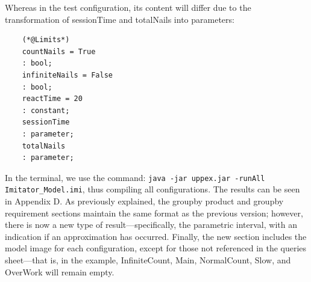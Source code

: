 Whereas in the test configuration, its content will differ due to the transformation of sessionTime and totalNails into parameters:

\begin{verbatim}
    (*@Limits*)
    countNails = True
    : bool;
    infiniteNails = False
    : bool;
    reactTime = 20
    : constant;
    sessionTime
    : parameter;
    totalNails
    : parameter;
\end{verbatim}


In the terminal, we use the command: \texttt{java -jar uppex.jar -runAll Imitator\_Model.imi}, thus compiling all configurations. The results can be seen in Appendix D. As previously explained, the groupby product and groupby requirement sections maintain the same format as the previous version; however, there is now a new type of result—specifically, the parametric interval, with an indication if an approximation has occurred. Finally, the new section includes the model image for each configuration, except for those not referenced in the queries sheet—that is, in the example, InfiniteCount, Main, NormalCount, Slow, and OverWork will remain empty.




















